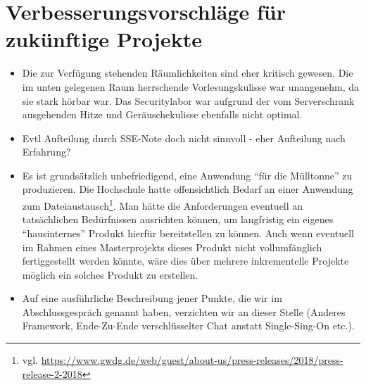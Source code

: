 \documentclass[12pt,DIV14,BCOR10mm,a4paper,parskip=half-,headsepline,headinclude,english,ngerman,bibliography=totocnumbered]{scrreprt}
\begin{document}
\chapter{Verbesserungsvorschläge für zukünftige Projekte}

\begin{itemize}
  \item Die zur Verfügung stehenden Räumlichkeiten sind eher kritisch gewesen. Die im unten gelegenen Raum herrschende Vorlesungskulisse war unangenehm, da sie stark hörbar war. Das Securitylabor war aufgrund der vom Serverschrank ausgehenden Hitze und Geräuschekulisse ebenfalls nicht optimal.
  \item Evtl Aufteilung durch SSE-Note doch nicht sinnvoll - eher Aufteilung nach Erfahrung?
  \item Es ist grundsätzlich unbefriedigend, eine Anwendung \enquote{für die Mülltonne} zu produzieren. Die Hochschule hatte offensichtlich Bedarf an einer Anwendung zum Dateiaustausch\footnote{vgl. \url{https://www.gwdg.de/web/guest/about-us/press-releases/2018/press-release-2-2018}}. Man hätte die Anforderungen eventuell an tatsächlichen Bedürfnissen ausrichten können, um langfristig ein eigenes \enquote{hausinternes} Produkt hierfür bereitstellen zu können. Auch wenn eventuell im Rahmen eines Masterprojekts dieses Produkt nicht vollumfänglich fertiggestellt werden könnte, wäre dies über mehrere inkrementelle Projekte möglich ein solches Produkt zu erstellen.
  \item Auf eine ausführliche Beschreibung jener Punkte, die wir im Abschlussgespräch genannt haben, verzichten wir an dieser Stelle (Anderes Framework, Ende-Zu-Ende verschlüsselter Chat anstatt Single-Sing-On etc.).
  \end{itemize}

\printbibliography

\printacronyms[title=Abkürzungsverzeichnis,toctitle=Abkürzungsverzeichnis]
\printglossary[title=Glossar,toctitle=Glossar,type=main]

\iftotalfigures
  \listoffigures
\fi


\begin{appendices}

\end{appendices}
\end{document}
